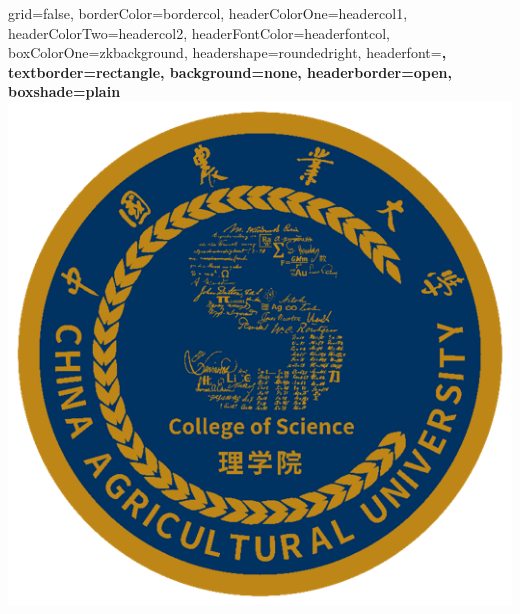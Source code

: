 \documentclass[a0paper,portrait]{baposter}
\begin{document}


\begin{poster}{
grid=false,
borderColor=bordercol, %
headerColorOne=headercol1, %
headerColorTwo=headercol2, %
headerFontColor=headerfontcol, %
boxColorOne=zkbackground,
headershape=roundedright, %
headerfont=\Large\sf\bf, %
textborder=rectangle,
background=none,
headerborder=open, %
boxshade=plain
}
%
%
{\includegraphics[scale=0.385]{logo_cau_science.png}} %

\end{poster}
\end{document}
